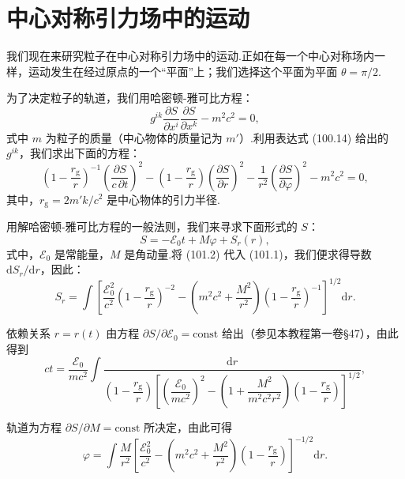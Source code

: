 \section{中心对称引力场中的运动}

我们现在来研究粒子在中心对称引力场中的运动.正如在每一个中心对称场内一样，运动发生在经过原点的一个“平面”上；我们选择这个平面为平面 $\theta=\pi/2$.

为了决定粒子的轨道，我们用哈密顿-雅可比方程：
\begin{equation*}
  g^{ik}\frac{\partial S}{\partial x^{i}}
  \frac{\partial S}{\partial x^{k}}-m^{2}c^{2}=0,
\end{equation*}
式中 $m$ 为粒子的质量（中心物体的质量记为 $m'$）.利用表达式 (100.14) 给出的 $g^{ik}$，我们求出下面的方程：
\begin{equation}
  \left(1-\frac{r_{\mathrm{g}}}{r}\right)^{-1}
  \left(\frac{\partial S}{c\,\partial t}\right)^{2}
  -\left(1-\frac{r_{\mathrm{g}}}{r}\right)
  \left(\frac{\partial S}{\partial r}\right)^{2}
  -\frac{1}{r^{2}}\left(\frac{\partial S}{\partial\varphi}\right)^{2}
  -m^{2}c^{2}=0,
\end{equation}
其中，$r_{\mathrm{g}}=2m'k/c^{2}$ 是中心物体的引力半径.

用解哈密顿-雅可比方程的一般法则，我们来寻求下面形式的 $S$：
\begin{equation}
  S=-\mathcal{E}_0t+M\varphi+S_r(r),
\end{equation}
式中，$\mathcal{E}_0$ 是常能量，$M$ 是角动量.将 (101.2) 代入 (101.1)，我们便求得导数 $\mathrm{d}S_r/\mathrm{d}r$，因此：
\begin{equation}
  S_r=\int\left[\frac{\mathcal{E}_0^{2}}{c^{2}}
  \left(1-\frac{r_{\mathrm{g}}}{r}\right)^{-2}
  -\left(m^{2}c^{2}+\frac{M^{2}}{r^{2}}\right)
  \left(1-\frac{r_{\mathrm{g}}}{r}\right)^{-1}\right]^{1/2}\mathrm{d}r.
\end{equation}

依赖关系 $r=r(t)$ 由方程 $\partial S/\partial\mathcal{E}_0=\mathrm{const}$ 给出（参见本教程第一卷§47），由此得到
\begin{equation}
  ct=\frac{\mathcal{E}_0}{mc^{2}}\int
  \frac{\mathrm{d}r}{\left(1-\dfrac{r_{\mathrm{g}}}{r}\right)
  \left[\left(\dfrac{\mathcal{E}_0}{mc^{2}}\right)^{2}
  -\left(1+\dfrac{M^{2}}{m^{2}c^{2}r^{2}}\right)
  \left(1-\dfrac{r_{\mathrm{g}}}{r}\right)\right]^{1/2}},
\end{equation}

轨道为方程 $\partial S/\partial M=\mathrm{const}$ 所决定，由此可得
\begin{equation}
  \varphi=\int\frac{M}{r^{2}}
  \left[\frac{\mathcal{E}_0^{2}}{c^{2}}
  -\left(m^{2}c^{2}+\frac{M^{2}}{r^{2}}\right)
  \left(1-\frac{r_{\mathrm{g}}}{r}\right)\right]^{-1/2}\mathrm{d}r.
\end{equation}

